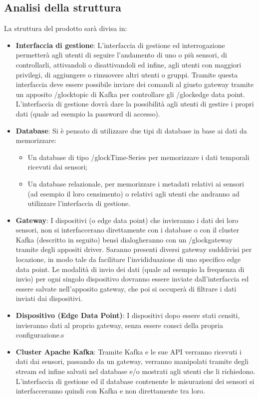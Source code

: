 	\subsection{Analisi della struttura}
		La struttura del prodotto sarà divisa in:
		\begin{itemize}
			\item \textbf{Interfaccia di gestione}: L'interfaccia di gestione ed interrogazione permetterà agli utenti di seguire l'andamento di uno o più sensori, di controllarli, attivandoli o disattivandoli ed infine, agli utenti con maggiori privilegi, di aggiungere o rimuovere altri utenti o gruppi.
			Tramite questa interfaccia deve essere possibile inviare dei comandi al giusto gateway tramite un apposito /glock{topic} di Kafka per controllare gli /glock{edge data point}. 
			L'interfaccia di gestione dovrà dare la possibilità agli utenti di gestire i propri dati (quale ad esempio la password di accesso).
			\item \textbf{Database}: Si è pensato di utilizzare due tipi di database in base ai dati da memorizzare:
			\begin{itemize}
				\item Un database di tipo /glock{Time-Series} per memorizzare i dati temporali ricevuti dai sensori;
				\item Un database relazionale, per memorizzare i metadati relativi ai sensori (ad esempio il loro censimento) o relativi agli utenti che andranno ad utilizzare l'interfaccia di gestione.
			\end{itemize}

			\item \textbf{Gateway}: I dispositivi (o edge data point) che invieranno i dati dei loro sensori, non si interfaccerano direttamente con i database o con il cluster Kafka (descritto in seguito) bensì dialogheranno con un /glock{gateway} tramite degli appositi driver.
			Saranno presenti diversi gateway sudddivisi per locazione, in modo tale da facilitare l'invididuazione di uno specifico edge data point.
			Le modalità di invio dei dati (quale ad esempio la frequenza di invio) per ogni singolo dispositivo dovranno essere inviate dall'interfaccia ed essere salvate nell'apposito gateway, che poi si occuperà di filtrare i dati inviati dai dispositivi. 

			\item \textbf{Dispositivo (Edge Data Point)}: I dispositivi dopo essere stati censiti, invieranno dati al proprio gateway, senza essere consci della propria configurazione.s 

			\item \textbf{Cluster Apache Kafka}: Tramite Kafka e le sue API verranno ricevuti i dati dai sensori, passando da un gateway, verranno manipolati tramite degli stream ed infine salvati nel database e/o mostrati agli utenti che li richiedono. L'interfaccia di gestione ed il database contenente le misurazioni dei sensori si interfacceranno quindi con Kafka e non direttamente tra loro.

		\end{itemize}
